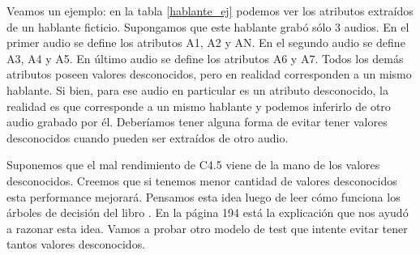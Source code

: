 Veamos un ejemplo: en la tabla \ref{hablante_ej} podemos ver los atributos extraídos de un hablante  ficticio. Supongamos que este hablante grabó sólo 3 audios. En el primer audio se define los atributos A1, A2 y AN. En el segundo audio se define A3, A4 y A5. En último audio se define los atributos A6 y A7. Todos los demás atributos poseen valores desconocidos, pero en realidad corresponden a un mismo hablante. Si bien, para ese audio en particular es un atributo desconocido, la realidad es que corresponde a un mismo hablante y podemos inferirlo de otro audio grabado por él. Deberíamos tener alguna forma de evitar tener valores desconocidos cuando pueden ser extraídos de otro audio.

Suponemos que el mal rendimiento de C4.5 viene de la mano de los valores desconocidos. Creemos que si tenemos menor cantidad de valores desconocidos esta performance mejorará. Pensamos esta idea luego de leer cómo funciona los árboles de decisión del libro \cite{DataMining-PracticalMachineLearningTools}. En la página 194 está la explicación que nos ayudó a razonar esta idea. Vamos a probar otro modelo de test que intente evitar tener tantos valores desconocidos. 